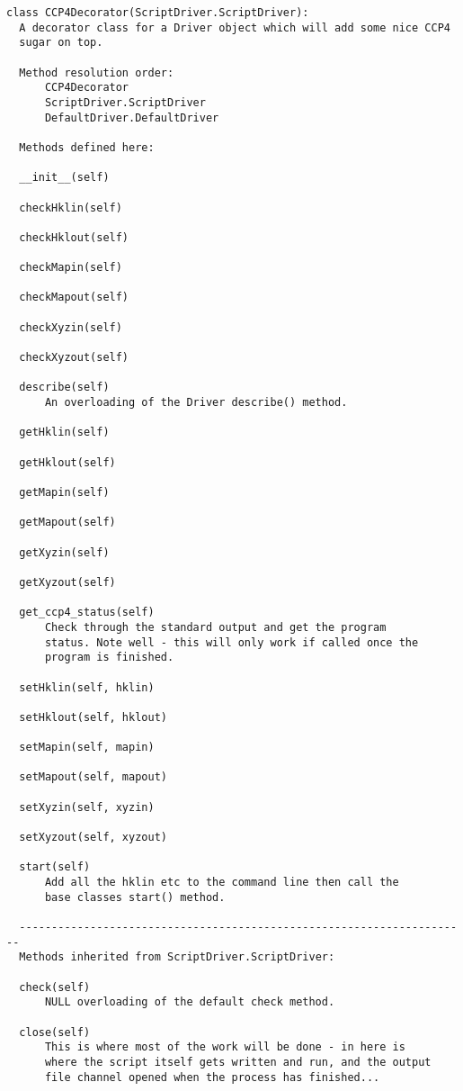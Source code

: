 \documentclass[a4paper, 11pt]{article}
\begin{document}
{
\tiny
\begin{verbatim}
class CCP4Decorator(ScriptDriver.ScriptDriver):
  A decorator class for a Driver object which will add some nice CCP4
  sugar on top.
  
  Method resolution order:
      CCP4Decorator
      ScriptDriver.ScriptDriver
      DefaultDriver.DefaultDriver
  
  Methods defined here:
  
  __init__(self)
  
  checkHklin(self)
  
  checkHklout(self)
  
  checkMapin(self)
  
  checkMapout(self)
  
  checkXyzin(self)
  
  checkXyzout(self)
  
  describe(self)
      An overloading of the Driver describe() method.
  
  getHklin(self)
  
  getHklout(self)
  
  getMapin(self)
  
  getMapout(self)
  
  getXyzin(self)
  
  getXyzout(self)
  
  get_ccp4_status(self)
      Check through the standard output and get the program
      status. Note well - this will only work if called once the
      program is finished.
  
  setHklin(self, hklin)
  
  setHklout(self, hklout)
  
  setMapin(self, mapin)
  
  setMapout(self, mapout)
  
  setXyzin(self, xyzin)
  
  setXyzout(self, xyzout)
  
  start(self)
      Add all the hklin etc to the command line then call the
      base classes start() method.
  
  ----------------------------------------------------------------------
  Methods inherited from ScriptDriver.ScriptDriver:
  
  check(self)
      NULL overloading of the default check method.
  
  close(self)
      This is where most of the work will be done - in here is
      where the script itself gets written and run, and the output
      file channel opened when the process has finished...
  

\end{verbatim}}
\end{document}
